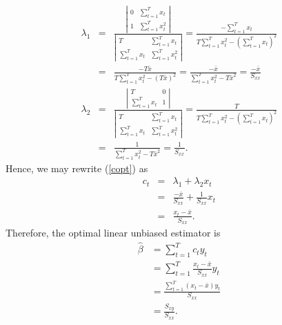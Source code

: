 \documentclass{article}
\begin{document}
\begin{eqnarray*}
\lambda _{1} &=&\frac{\left\vert 
\begin{array}{cc}
0 & \sum_{t=1}^{T}x_{t} \\ 
1 & \sum_{t=1}^{T}x_{t}^{2}%
\end{array}%
\right\vert }{\left\vert 
\begin{array}{cc}
T & \sum_{t=1}^{T}x_{t} \\ 
\sum_{t=1}^{T}x_{t} & \sum_{t=1}^{T}x_{t}^{2}%
\end{array}%
\right\vert }=\frac{-\sum_{t=1}^{T}x_{t}}{T\sum_{t=1}^{T}x_{t}^{2}-\left(
\sum_{t=1}^{T}x_{t}\right) ^{2}} \\
&=&\frac{-T\bar{x}}{T\sum_{t=1}^{T}x_{t}^{2}-\left( T\bar{x}\right) ^{2}}=%
\frac{-\bar{x}}{\sum_{t=1}^{T}x_{t}^{2}-T\bar{x}^{2}}=\frac{-\bar{x}}{S_{xx}}
\\
\lambda _{2} &=&\frac{\left\vert 
\begin{array}{cc}
T & 0 \\ 
\sum_{t=1}^{T}x_{t} & 1%
\end{array}%
\right\vert }{\left\vert 
\begin{array}{cc}
T & \sum_{t=1}^{T}x_{t} \\ 
\sum_{t=1}^{T}x_{t} & \sum_{t=1}^{T}x_{t}^{2}%
\end{array}%
\right\vert }=\frac{T}{T\sum_{t=1}^{T}x_{t}^{2}-\left(
\sum_{t=1}^{T}x_{t}\right) ^{2}} \\
&=&\frac{1}{\sum_{t=1}^{T}x_{t}^{2}-T\bar{x}^{2}}=\frac{1}{S_{xx}}.
\end{eqnarray*}%
Hence, we may rewrite (\ref{copt}) as
\begin{eqnarray*}
c_{t} &=&\lambda _{1}+\lambda _{2}x_{t} \\
&=&\frac{-\bar{x}}{S_{xx}}+\frac{1}{S_{xx}}x_{t} \\
&=&\frac{x_{t}-\bar{x}}{S_{xx}}.
\end{eqnarray*}
Therefore, the optimal linear unbiased estimator is
\begin{align*}
\hat{\beta} &=\sum_{t=1}^{T}c_{t}y_{t} \\
&=\sum_{t=1}^{T}\frac{x_{t}-\bar{x}}{S_{xx}}y_{t} \\
&=\frac{\sum_{t=1}^{T}(x_t-\bar{x})y_t}{S_{xx}}\\
&=\frac{S_{xy}}{S_{xx}}.
\end{align*}
\end{document}
